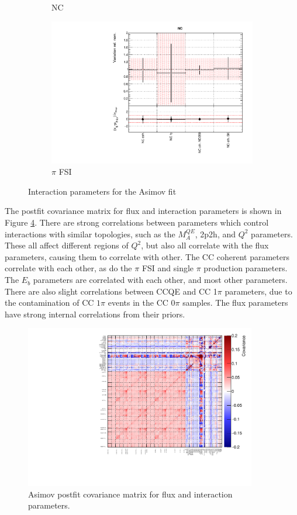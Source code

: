 \begin{figure}
\begin{subfigure}{0.49\textwidth}
  \caption{NC}
  \label{fig:}
\end{subfigure}
\begin{subfigure}{0.49\textwidth}
  \centering
  \includegraphics[width=0.95\linewidth]{figs/asmvxsec4}
  \caption{$\pi$ FSI}
  \label{fig:}
\end{subfigure}
\caption{Interaction parameters for the Asimov fit}
\label{fig:asmvxsec}
\end{figure}

The postfit covariance matrix for flux and interaction parameters is shown in Figure \ref{fig:asmvpostfitcov}. There are strong correlations between parameters which control interactions with similar topologies, such as the $M^{QE}_A$, 2p2h, and $Q^2$ parameters. These all affect different regions of $Q^2$, but also all correlate with the flux parameters, causing them to correlate with other. The CC coherent parameters correlate with each other, as do the $\pi$ FSI and single $\pi$ production parameters. The $E_b$ parameters are correlated with each other, and most other parameters. There are also slight correlations between CCQE and CC 1$\pi$ parameters, due to the contamination of CC $1\pi$ events in the CC 0$\pi$ samples. The flux parameters have strong internal correlations from their priors.

\begin{figure}
\centering
\includegraphics*[width=0.9\textwidth,clip]{figs/asmvpostfitcov}
\caption{Asimov postfit covariance matrix for flux and interaction parameters.}\label{fig:asmvpostfitcov}
\end{figure}

